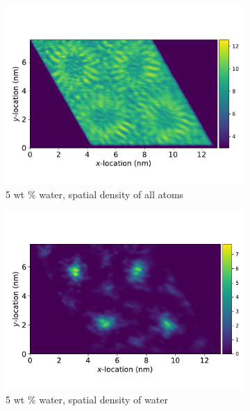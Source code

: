 \documentclass{article}
\begin{document}
  \begin{figure}[!htb]
  \centering
  \begin{subfigure}{0.45\textwidth}
  \includegraphics[width=\textwidth]{total_density_5wt.pdf}
  \caption{5 wt \% water, spatial density of all atoms}\label{fig:total_density_5wt}
  \end{subfigure}
  \begin{subfigure}{0.45\textwidth}
  \includegraphics[width=\textwidth]{total_water_density_5wt.pdf}
  \caption{5 wt \% water, spatial density of water}\label{fig:total_water_density_5wt}
  \end{subfigure}
  \begin{subfigure}{0.45\textwidth}

\end{subfigure}
\end{figure}
\end{document}
